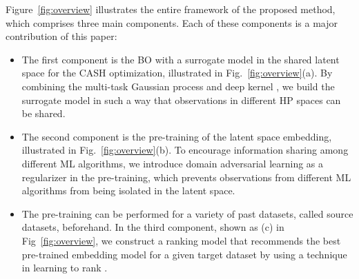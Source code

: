 %

\begin{figure*}
 \centering
 \caption{Overview of Proposed Framework.}
 \label{fig:overview}
\end{figure*}

Figure~\ref{fig:overview} illustrates the entire framework of the proposed method, which comprises three main components. 
%
Each of these components is a major contribution of this paper:
%
\begin{itemize}
 \setlength{\leftskip}{1em}
 \item %
       The first component is the BO with a surrogate model in the shared latent space for the CASH optimization, illustrated in Fig.~\ref{fig:overview}(a).
       By combining the multi-task Gaussian process \cite{alvarez2012kernels} and deep kernel \cite{wilson16deep}, we build the surrogate model in such a way that observations in different HP spaces can be shared. 
 \item %
       The second component is the pre-training of the latent space embedding, illustrated in Fig.~\ref{fig:overview}(b).
       To encourage information sharing among different ML algorithms, we introduce domain adversarial learning \cite{ganin2016domain} as a regularizer in the pre-training, which prevents observations from different ML algorithms from being isolated in the latent space.
 \item The pre-training can be performed for a variety of past datasets, called source datasets, beforehand.
       In the third component, shown as (c) in Fig~\ref{fig:overview}, we construct a ranking model that recommends the best pre-trained embedding model for a given target dataset by using a technique in learning to rank \cite{liu2011learning}.
\end{itemize}
